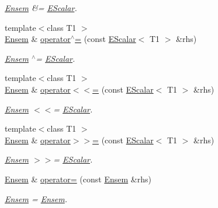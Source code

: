 \begin{DoxyCompactItemize}
\begin{DoxyCompactList}\small\item\em \mbox{\hyperlink{classENSEM_1_1Ensem}{Ensem}} \&= \mbox{\hyperlink{classENSEM_1_1EScalar}{E\+Scalar}}. \end{DoxyCompactList}\item 
{\footnotesize template$<$class T1 $>$ }\\\mbox{\hyperlink{classENSEM_1_1Ensem}{Ensem}} \& \mbox{\hyperlink{classENSEM_1_1Ensem_a7f9a469a80ccb509892aef8d356fd81e}{operator$^\wedge$=}} (const \mbox{\hyperlink{classENSEM_1_1EScalar}{E\+Scalar}}$<$ T1 $>$ \&rhs)
\begin{DoxyCompactList}\small\item\em \mbox{\hyperlink{classENSEM_1_1Ensem}{Ensem}} $^\wedge$= \mbox{\hyperlink{classENSEM_1_1EScalar}{E\+Scalar}}. \end{DoxyCompactList}\item 
{\footnotesize template$<$class T1 $>$ }\\\mbox{\hyperlink{classENSEM_1_1Ensem}{Ensem}} \& \mbox{\hyperlink{classENSEM_1_1Ensem_a9aecabccdc31d9b43db877a82879f702}{operator$<$$<$=}} (const \mbox{\hyperlink{classENSEM_1_1EScalar}{E\+Scalar}}$<$ T1 $>$ \&rhs)
\begin{DoxyCompactList}\small\item\em \mbox{\hyperlink{classENSEM_1_1Ensem}{Ensem}} $<$$<$= \mbox{\hyperlink{classENSEM_1_1EScalar}{E\+Scalar}}. \end{DoxyCompactList}\item 
{\footnotesize template$<$class T1 $>$ }\\\mbox{\hyperlink{classENSEM_1_1Ensem}{Ensem}} \& \mbox{\hyperlink{classENSEM_1_1Ensem_a9511b1d1b45de39920d451700eecd4d9}{operator$>$$>$=}} (const \mbox{\hyperlink{classENSEM_1_1EScalar}{E\+Scalar}}$<$ T1 $>$ \&rhs)
\begin{DoxyCompactList}\small\item\em \mbox{\hyperlink{classENSEM_1_1Ensem}{Ensem}} $>$$>$= \mbox{\hyperlink{classENSEM_1_1EScalar}{E\+Scalar}}. \end{DoxyCompactList}\item 
\mbox{\hyperlink{classENSEM_1_1Ensem}{Ensem}} \& \mbox{\hyperlink{classENSEM_1_1Ensem_a2f4f881dde88dfaf425051580e477e6c}{operator=}} (const \mbox{\hyperlink{classENSEM_1_1Ensem}{Ensem}} \&rhs)
\begin{DoxyCompactList}\small\item\em \mbox{\hyperlink{classENSEM_1_1Ensem}{Ensem}} = \mbox{\hyperlink{classENSEM_1_1Ensem}{Ensem}}. \end{DoxyCompactList}\item 

\end{DoxyCompactItemize}
